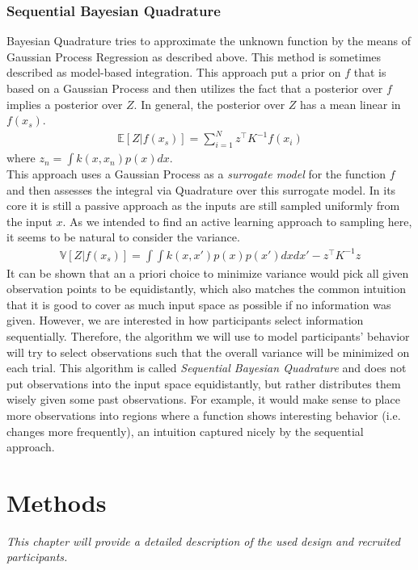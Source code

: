 \documentclass[oneside, 11pt]{book}
\begin{document}
\subsection{Sequential Bayesian Quadrature}
Bayesian Quadrature tries to approximate the unknown function by the means of Gaussian Process Regression as described above. This method is sometimes described as model-based integration. This approach put a prior on $f$ that is based on a Gaussian Process and then utilizes the fact that a posterior over $f$ implies a posterior over $Z$. In general, the posterior over $Z$ has a mean linear in $f(x_s)$.
\begin{align}
\mathbb{E}[Z|f(x_s)]=\sum_{i=1}^{N}z^{\top}K^{-1}f(x_i)
\end{align}
where $z_n=\int k(x,x_n)p(x)dx$.\\
This approach uses a Gaussian Process as a \emph{surrogate model} for the function $f$ and then assesses the integral via Quadrature over this surrogate model. In its core it is still a passive approach as the inputs are still sampled uniformly from the input $x$. As we intended to find an active learning approach to sampling here, it seems to be natural to consider the variance.
\begin{align}
\mathbb{V}[Z|f(x_s)]=\int \int k(x,x')p(x)p(x')dxdx'-z^{\top}K^{-1}z
\end{align}
It can be shown that an a priori choice to minimize variance would pick all given observation points to be equidistantly, which also matches the common intuition that it is good to cover as much input space as possible if no information was given. However, we are interested in how participants select information sequentially. Therefore, the algorithm we will use to model participants' behavior will try to select observations such that the overall variance will be minimized on each trial. This algorithm is called \emph{Sequential Bayesian Quadrature} and does not put observations into the input space equidistantly, but rather distributes them wisely given some past observations. For example, it would make sense to place more observations into regions where a function shows interesting behavior (i.e. changes more frequently), an intuition captured nicely by the sequential approach.

\chapter{Methods}
\emph{This chapter will provide a detailed description of the used design and recruited participants.}
\end{document}
